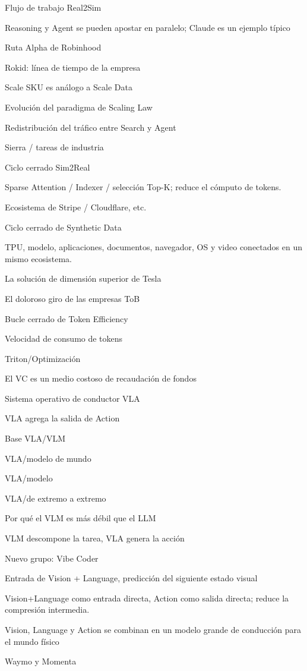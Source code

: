 \documentclass{article}
\begin{document}
Flujo de trabajo Real2Sim

Reasoning y Agent se pueden apostar en paralelo; Claude es un ejemplo típico

Ruta Alpha de Robinhood

Rokid: línea de tiempo de la empresa

Scale SKU es análogo a Scale Data

Evolución del paradigma de Scaling Law

Redistribución del tráfico entre Search y Agent

Sierra / tareas de industria

Ciclo cerrado Sim2Real

Sparse Attention / Indexer / selección Top-K; reduce el cómputo de tokens.

Ecosistema de Stripe / Cloudflare, etc.

Ciclo cerrado de Synthetic Data

TPU, modelo, aplicaciones, documentos, navegador, OS y video conectados en un mismo ecosistema.

La solución de dimensión superior de Tesla

El doloroso giro de las empresas ToB

Bucle cerrado de Token Efficiency

Velocidad de consumo de tokens

Triton/Optimización

El VC es un medio costoso de recaudación de fondos

Sistema operativo de conductor VLA

VLA agrega la salida de Action

Base VLA/VLM

VLA/modelo de mundo

VLA/modelo

VLA/de extremo a extremo

Por qué el VLM es más débil que el LLM

VLM descompone la tarea, VLA genera la acción

Nuevo grupo: Vibe Coder

Entrada de Vision + Language, predicción del siguiente estado visual

Vision+Language como entrada directa, Action como salida directa; reduce la compresión intermedia.

Vision, Language y Action se combinan en un modelo grande de conducción para el mundo físico

Waymo y Momenta
\end{document}

